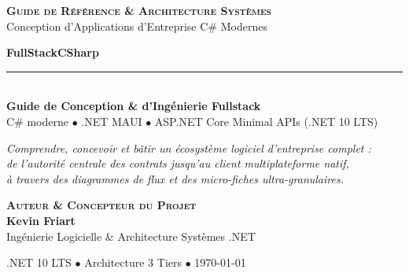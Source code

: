 \documentclass[a4paper,11pt]{report}
\begin{document}
\begin{titlepage}
\begin{center}
    \vspace*{1.2cm}
    
    {\scshape\large\bfseries\color{secondary} Guide de Référence \& Architecture Systèmes}\\[0.3cm]
    {\footnotesize\color{gray!80!black} Conception d'Applications d'Entreprise C\# Modernes}
    
    \vfill
    
    {\fontsize{40}{48}\selectfont\bfseries\color{primary} FullStackCSharp}\\[0.4cm]
    {\color{secondary}\rule{9cm}{1.5pt}}\\[0.6cm]
    {\LARGE\bfseries\color{secondary} Guide de Conception \& d'Ingénierie Fullstack}\\[0.3cm]
    {\large\color{gray!85!black} C\# moderne $\bullet$ .NET MAUI $\bullet$ ASP.NET Core Minimal APIs (.NET 10 LTS)}
    
    \vfill
    
    \begin{tcolorbox}[enhanced,colback=secondary!4!white,colframe=secondary!35!white,arc=3mm,boxrule=0.9pt,width=0.88\textwidth,top=5mm,bottom=5mm,left=6mm,right=6mm]
        \centering\normalsize\itshape\color{primary}
        Comprendre, concevoir et bâtir un écosystème logiciel d'entreprise complet :\\
        de l'autorité centrale des contrats jusqu'au client multiplateforme natif,\\
        à travers des diagrammes de flux et des micro-fiches ultra-granulaires.
    \end{tcolorbox}
    
    \vfill
    
    \begin{tcolorbox}[enhanced,colback=white,colframe=borderlight,arc=3.5mm,boxrule=1.1pt,width=0.75\textwidth,drop fuzzy shadow=black!10,top=6mm,bottom=6mm]
        \centering
        {\footnotesize\scshape\bfseries\color{secondary} Auteur \& Concepteur du Projet}\\[0.3cm]
        {\huge\bfseries\color{primary} Kevin Friart}\\[0.25cm]
        {\normalsize\color{gray!85!black} Ingénierie Logicielle \& Architecture Systèmes .NET}
    \end{tcolorbox}
    
    \vfill
    
    {\small\color{gray} .NET 10 LTS $\bullet$ Architecture 3 Tiers $\bullet$ \today}
    
    \vspace*{0.8cm}
\end{center}
\end{titlepage}
\end{document}
